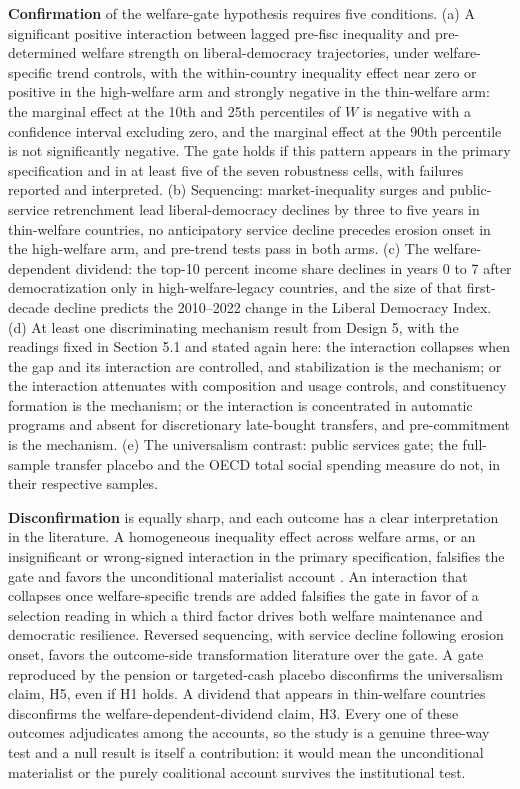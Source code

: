 \textbf{Confirmation} of the welfare-gate hypothesis requires five conditions. (a) A significant positive interaction between lagged pre-fisc inequality and pre-determined welfare strength on liberal-democracy trajectories, under welfare-specific trend controls, with the within-country inequality effect near zero or positive in the high-welfare arm and strongly negative in the thin-welfare arm: the marginal effect at the 10th and 25th percentiles of $W$ is negative with a confidence interval excluding zero, and the marginal effect at the 90th percentile is not significantly negative. The gate holds if this pattern appears in the primary specification and in at least five of the seven robustness cells, with failures reported and interpreted. (b) Sequencing: market-inequality surges and public-service retrenchment lead liberal-democracy declines by three to five years in thin-welfare countries, no anticipatory service decline precedes erosion onset in the high-welfare arm, and pre-trend tests pass in both arms. (c) The welfare-dependent dividend: the top-10 percent income share declines in years 0 to 7 after democratization only in high-welfare-legacy countries, and the size of that first-decade decline predicts the 2010--2022 change in the Liberal Democracy Index. (d) At least one discriminating mechanism result from Design 5, with the readings fixed in Section 5.1 and stated again here: the interaction collapses when the gap and its interaction are controlled, and stabilization is the mechanism; or the interaction attenuates with composition and usage controls, and constituency formation is the mechanism; or the interaction is concentrated in automatic programs and absent for discretionary late-bought transfers, and pre-commitment is the mechanism. (e) The universalism contrast: public services gate; the full-sample transfer placebo and the OECD total social spending measure do not, in their respective samples.

\textbf{Disconfirmation} is equally sharp, and each outcome has a clear interpretation in the literature. A homogeneous inequality effect across welfare arms, or an insignificant or wrong-signed interaction in the primary specification, falsifies the gate and favors the unconditional materialist account \citep{RauStokes2025, Houle2009}. An interaction that collapses once welfare-specific trends are added falsifies the gate in favor of a selection reading in which a third factor drives both welfare maintenance and democratic resilience. Reversed sequencing, with service decline following erosion onset, favors the outcome-side transformation literature \citep{SzikraOktem2023, LendvaiBainton2021, Vanhuysse2006, Benczes2024} over the gate. A gate reproduced by the pension or targeted-cash placebo disconfirms the universalism claim, H5, even if H1 holds. A dividend that appears in thin-welfare countries disconfirms the welfare-dependent-dividend claim, H3. Every one of these outcomes adjudicates among the accounts, so the study is a genuine three-way test and a null result is itself a contribution: it would mean the unconditional materialist or the purely coalitional account survives the institutional test.

